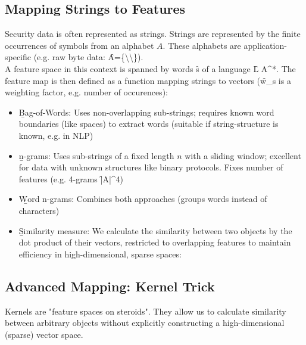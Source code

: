 \subsection{Mapping Strings to Features}
Security data is often represented as strings. Strings are represented by the finite occurrences of symbols from an alphabet $A$. These alphabets are application-specific (e.g. raw byte data: \f{A=\left\{\backslash{}\backslash{}\right\}}).\\[1em]
A feature space in this context is spanned by words \f{s} of a language \f{L \subseteq A^*}. The feature map is then defined as a function mapping strings to vectors (\f{w_s} is a weighting factor, e.g. number of occurences):
\begin{itemize}
    \item \b{Bag-of-Words}: Uses non-overlapping sub-strings; requires known word boundaries (like spaces) to extract words (suitable if string-structure is known, e.g. in NLP)
    \item \b{n-grams}: Uses sub-strings of a fixed length $n$ with a sliding window; excellent for data with unknown structures like binary protocols. Fixes number of features (e.g. 4-grams \f{\rightarrow |A|^4})
    \item \b{Word n-grams}: Combines both approaches (groups words instead of characters)
    \item \b{Similarity measure}: We calculate the similarity between two objects by the dot product of their vectors, restricted to overlapping features to maintain efficiency in high-dimensional, sparse spaces:
\end{itemize}

\subsection{Advanced Mapping: Kernel Trick}
Kernels are "feature spaces on steroids". They allow us to calculate similarity between arbitrary objects without explicitly constructing a high-dimensional (sparse) vector space.

